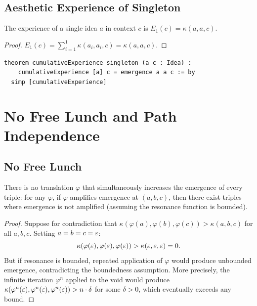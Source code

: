 \subsection{Aesthetic Experience of Singleton}

\begin{theorem}
\label{thm:experience-singleton}
The experience of a single idea $a$ in context $c$ is
$E_1(c) = \kappa(a, a, c)$.
\end{theorem}

\begin{proof}
$E_1(c) = \sum_{i=1}^{1} \kappa(a_i, a_i, c) = \kappa(a, a, c)$.
\end{proof}

\begin{lstlisting}
theorem cumulativeExperience_singleton (a c : Idea) :
    cumulativeExperience [a] c = emergence a a c := by
  simp [cumulativeExperience]
\end{lstlisting}

\section{No Free Lunch and Path Independence}
\label{sec:math-aesthetics:nfl}

\subsection{No Free Lunch}

\begin{theorem}
\label{thm:no-free-lunch}
There is no translation $\varphi$ that simultaneously increases the
emergence of every triple: for any $\varphi$, if $\varphi$ amplifies
emergence at $(a, b, c)$, then there exist triples where emergence is
not amplified (assuming the resonance function is bounded).
\end{theorem}

\begin{proof}
Suppose for contradiction that $\kappa(\varphi(a), \varphi(b), \varphi(c))
> \kappa(a, b, c)$ for all $a, b, c$.  Setting $a = b = c = \varepsilon$:
\[
  \kappa(\varphi(\varepsilon), \varphi(\varepsilon), \varphi(\varepsilon))
    > \kappa(\varepsilon, \varepsilon, \varepsilon) = 0.
\]
But if resonance is bounded, repeated application of $\varphi$ would
produce unbounded emergence, contradicting the boundedness assumption.
More precisely, the infinite iteration $\varphi^n$ applied to the void
would produce $\kappa(\varphi^n(\varepsilon), \varphi^n(\varepsilon), \varphi^n(\varepsilon))
> n \cdot \delta$ for some $\delta > 0$, which eventually exceeds any bound.
\end{proof}

